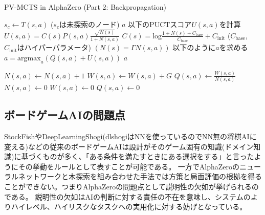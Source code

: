 \begin{algorithm}
    \caption{PV-MCTS in AlphaZero (Part 2: Backpropagation)}
    \label{alg:mcts-2}
    \begin{algorithmic}[1]
                \State $s_c \gets T(s, a)$ ($s_c$は未探索のノード)
                \State {}
                \State \Return $a$
            \Else
                \State 以下のPUCTスコア$U(s, a)$を計算
                \State $U(s, a)= C(s)P(s, a)\frac{\sqrt{N(s)}}{1+N(s, a)}$
                \State $C(s)=\textrm{log}\frac{1+N(s)+C_{\textrm{base}}}{C_{\textrm{base}}}+C_{\textrm{init}}$
                \State($C_{\textrm{base}}$, $C_{\textrm{init}}$はハイパーパラメータ)
                \State $(N(s)=\Gamma N(s, a))$
                \State 以下のように$a$を求める
                \State $a = {\textrm{argmax}}_a (Q(s, a)+U(s, a))$
                \State \Return $a$
                
            \EndIf
        \EndFunction
                \State $N(s, a) \gets  N(s, a)+1$
                \State $W(s, a) \gets  W(s, a)+G$
                \State $Q(s, a) \gets \frac{W(s, a)}{N(s, a)}$
            \EndFor
        \EndFunction
                \State $N(s, a) \gets 0$
                \State $W(s, a) \gets 0$
                \State $Q(s, a) \gets 0$
            \EndFor
        \EndFunction
    \end{algorithmic}
\end{algorithm}


\subsection{ボードゲームAIの問題点}
StockFish\cite{StockFish}やDeepLearningShogi\cite{dlshogi}(dlshogiはNNを使っているのでNN無の将棋AIに変える)などの従来のボードゲームAIは設計がそのゲーム固有の知識(ドメイン知識)に基づくものが多く、「ある条件を満たすときにある選択をする」と言ったようにその挙動をルールとして表すことが可能である。
一方でAlphaZeroのニューラルネットワークと木探索を組み合わせた手法では方策と局面評価の根拠を得ることができない。つまりAlphaZeroの問題点として説明性の欠如が挙げられるのである。
説明性の欠如はAIの判断に対する責任の不在を意味し、システムのよりハイレベル、ハイリスクなタスクへの実用化に対する妨げとなっている。



